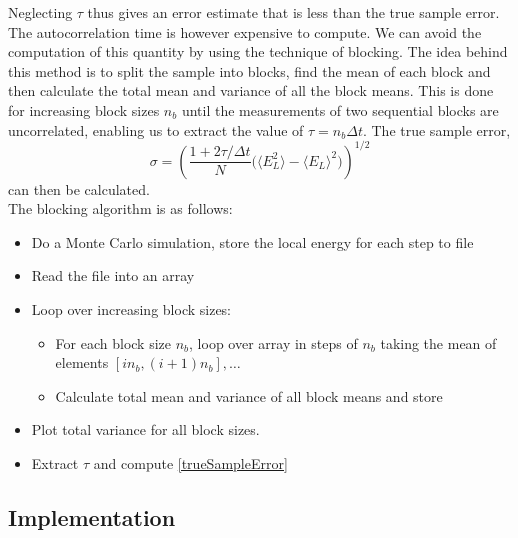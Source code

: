 \documentclass[english, a4paper]{article}
\begin{document}
Neglecting $\tau$ thus gives an error estimate that is less than the true sample error. 
The autocorrelation time is however expensive to compute. We can avoid the computation of this quantity by using
the technique of blocking. The idea behind this method is to split the sample into blocks, find the mean of each block
and then calculate the total mean and variance of all the block means.
This is done for increasing block sizes $n_b$ until the measurements of two sequential blocks are uncorrelated,
enabling us to extract the value of $\tau = n_b\Delta t$. The true sample error,
\begin{equation}
 \sigma = \left( \frac{1 + 2\tau / \Delta t}{N} \bigr( \langle E_L^2\rangle - \langle E_L \rangle^2\bigr) \right)^{1/2}
 \label{trueSampleError}
\end{equation}
can then be calculated. \\


\noindent The blocking algorithm is as follows:
\begin{itemize}
 \item Do a Monte Carlo simulation, store the local energy for each step to file
 \item Read the file into an array
 \item Loop over increasing block sizes:
 \begin{itemize}
     \item For each block size $n_b$, loop over array in steps of $n_b$ taking the mean of elements
           $[in_b, (i+1)n_b] , \dots $
     \item Calculate total mean and variance of all block means and store
 \end{itemize}
 \item Plot total variance for all block sizes. 
 \item Extract $\tau$ and compute \eqref{trueSampleError}
\end{itemize}





\subsection{Implementation}
\end{document}
